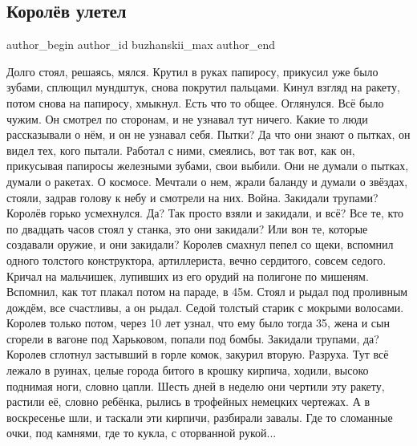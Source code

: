  
 
 
 
 
\subsection{Королёв улетел}
\label{sec:12_01_2021.fb.buzhanskii.1.korolev_uletel}
\ifcmt
  author_begin
   author_id buzhanskii_max
  author_end
\fi

\obeycr
Долго стоял, решаясь, мялся.
Крутил в руках папиросу, прикусил уже было зубами, сплющил мундштук, снова покрутил пальцами.
Кинул взгляд на ракету, потом снова на папиросу, хмыкнул.
Есть что то общее.
Оглянулся.
Всё было чужим.
Он смотрел по сторонам, и не узнавал тут ничего.
Какие то люди рассказывали о нём, и он не узнавал себя.
Пытки?
Да что они знают о пытках, он видел тех, кого пытали.
Работал с ними, смеялись, вот так вот, как он, прикусывая папиросы железными зубами, свои выбили.
Они не думали о пытках, думали о ракетах.
О космосе.
Мечтали о нем, жрали баланду и думали о звёздах, стояли, задрав голову к небу и смотрели на них.
Война.
Закидали трупами?
Королёв горько усмехнулся.
Да?
Так просто взяли и закидали, и всё?
Все те, кто по двадцать часов стоял у станка, это они закидали?
Или вон те, которые создавали оружие, и они закидали?
Королев смахнул пепел со щеки, вспомнил одного толстого конструктора, артиллериста, вечно сердитого, совсем седого.
Кричал на мальчишек, лупивших из его орудий на полигоне по мишеням.
Вспомнил, как тот плакал потом на параде, в 45м.
Стоял и рыдал под проливным дождём, все счастливы, а он рыдал.
Седой толстый старик с мокрыми волосами.
Королев только потом, через 10 лет узнал, что ему было тогда 35, жена и сын сгорели в вагоне под Харьковом, попали под бомбы.
Закидали трупами, да?
Королев сглотнул застывший в горле комок, закурил вторую.
Разруха.
Тут всё лежало в руинах, целые города битого в крошку кирпича, ходили, высоко поднимая ноги, словно цапли.
Шесть дней в неделю они чертили эту ракету, растили её, словно ребёнка, рылись в трофейных немецких чертежах.
А в воскресенье шли, и таскали эти кирпичи, разбирали завалы.
Где то сломанные очки, под камнями, где то кукла, с оторванной рукой...

